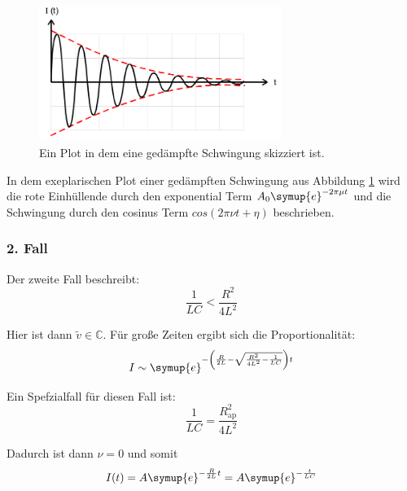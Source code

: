         \begin{figure}[H]
            \centering
            \includegraphics[width=0.7\textwidth]{images/ged.PNG}
            \caption{Ein Plot in dem eine gedämpfte Schwingung skizziert ist.}
            \label{img:gedSch}
        \end{figure}

        \noindent In dem exeplarischen Plot einer gedämpften Schwingung aus Abbildung \ref{img:gedSch} wird die rote Einhüllende durch den 
        exponential Term $A_0 \symup{e}^{- 2 \pi \mu t}$ und die Schwingung durch den cosinus Term $cos(2\pi \nu t + \eta)$ beschrieben.

        \subsubsection{2. Fall}


        \noindent Der zweite Fall beschreibt:
        \begin{equation}
            \frac{1}{LC} < \frac{R^2}{4L^2} \nonumber
        \end{equation}

        \noindent Hier ist dann $\tilde{v} \in \mathds{C}$.
        Für große Zeiten ergibt sich die Proportionalität:
        \begin{equation}   
            I \sim \symup{e}^{- \left( \frac{R}{2L} - \sqrt{\frac{R^2}{4L^2} - \frac{1}{LC}}\right) t} \nonumber
        \end{equation}

        \noindent Ein Spefzialfall für diesen Fall ist:
        \begin{equation}
            \frac{1}{LC} = \frac{R^2_{\text{ap}}}{4L^2} \nonumber
        \end{equation}
        
        \noindent Dadurch ist dann $\nu = 0$ und somit
        \begin{equation}
            I(t) = A \symup{e}^{-\frac{R}{2L}t} = A \symup{e}^{-\frac{t}{LC}} \nonumber
        \end{equation}

